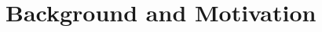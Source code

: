 \documentclass[sigconf]{acmart}
\begin{document}
\section{Background and Motivation}\label{srrapp}
%
%
\end{document}
